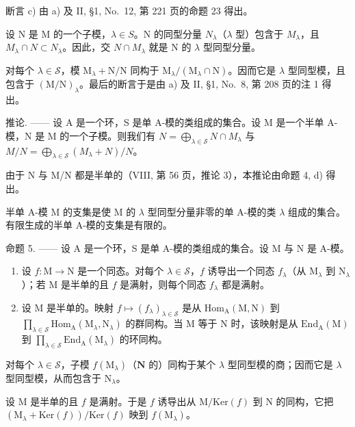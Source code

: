 断言 c) 由 a) 及 II, §1, No.~12, 第 221 页的命题 23 得出。

设 N 是 M 的一个子模，\(\lambda\in S\)。N 的同型分量 \(N_{\lambda}\)（\(\lambda\) 型）包含于 \(M_{\lambda}\)，且 \(M_{\lambda}\cap N\subset N_{\lambda}\)。因此，交 \(N\cap M_{\lambda}\) 就是 N 的 \(\lambda\) 型同型分量。

对每个 \(\lambda \in \mathcal{S}\)，模 \(\mathrm{M}_{\lambda} + \mathrm{N} / \mathrm{N}\) 同构于 \(\mathrm{M}_{\lambda} / (\mathrm{M}_{\lambda} \cap \mathrm{N})\)。因而它是 \(\lambda\) 型同型模，且包含于 \((\mathrm{M} / \mathrm{N})_{\lambda}\)。最后的断言于是由 a) 及 II, §1, No.~8, 第 208 页的注 1 得出。

推论. —— 设 A 是一个环，S 是单 A-模的类组成的集合。设 M 是一个半单 A-模，N 是 M 的一个子模。则我们有 \(N = \bigoplus_{\lambda \in \mathscr{S}} N \cap M_{\lambda}\) 与 \(M/N = \bigoplus_{\lambda \in \mathscr{S}} (M_{\lambda} + N)/N\)。

由于 N 与 M/N 都是半单的（VIII, 第 56 页，推论 3），本推论由命题 4, d) 得出。

半单 A-模 M 的支集是使 M 的 \(\lambda\) 型同型分量非零的单 A-模的类 \(\lambda\) 组成的集合。有限生成的半单 A-模的支集是有限的。

命题 5. —— 设 A 是一个环，S 是单 A-模的类组成的集合。设 M 与 N 是 A-模。

\begin{enumerate}
\def\labelenumi{\alph{enumi})}
\item
  设 \(f: \mathrm{M} \to \mathrm{N}\) 是一个同态。对每个 \(\lambda \in \mathcal{S}\)，\(f\) 诱导出一个同态 \(f_{\lambda}\)（从 \(\mathrm{M}_{\lambda}\) 到 \(\mathrm{N}_{\lambda}\)）；若 \(\mathrm{M}\) 是半单的且 \(f\) 是满射，则每个同态 \(f_{\lambda}\) 都是满射。
\item
  设 M 是半单的。映射 \(f \mapsto (f_{\lambda})_{\lambda \in \mathcal{S}}\) 是从 \(\mathrm{Hom}_{\mathrm{A}}(\mathrm{M},\mathrm{N})\) 到 \(\prod_{\lambda \in \mathcal{S}}\mathrm{Hom}_{\mathrm{A}}(\mathrm{M}_{\lambda},\mathrm{N}_{\lambda})\) 的群同构。当 M 等于 N 时，该映射是从 \(\mathrm{End}_{\mathrm{A}}(\mathrm{M})\) 到 \(\prod_{\lambda \in \mathcal{S}}\mathrm{End}_{\mathrm{A}}(\mathrm{M}_{\lambda})\) 的环同构。
\end{enumerate}

对每个 \(\lambda \in \mathcal{S}\)，子模 \(f(\mathrm{M}_{\lambda})\)（\(\mathbf{N}\) 的）同构于某个 \(\lambda\) 型同型模的商；因而它是 \(\lambda\) 型同型模，从而包含于 \(\mathrm{N}_{\lambda}\)。

设 \(\mathrm{M}\) 是半单的且 \(f\) 是满射。于是 \(f\) 诱导出从 \(\mathrm{M} / \mathrm{Ker}(f)\) 到 \(\mathrm{N}\) 的同构，它把 \((\mathrm{M}_{\lambda} + \mathrm{Ker}(f)) / \mathrm{Ker}(f)\) 映到 \(f(\mathrm{M}_{\lambda})\)。

